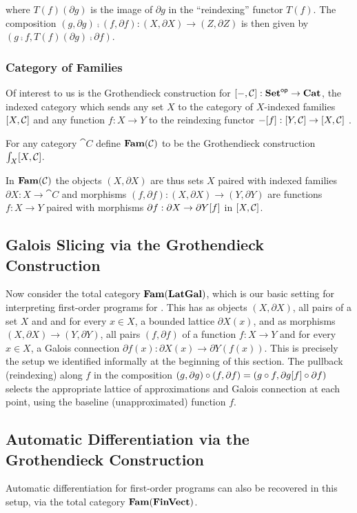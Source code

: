 \noindent where $T(f)(\partial g)$ is the image of $\partial g$ in the ``reindexing'' functor $T(f)$. The
composition $(g, \partial g) \comp (f, \partial f): (X, \partial X) \to (Z, \partial Z)$ is then given by $(g
\comp f, T(f)(\partial g) \comp \partial f)$.

\subsubsection{Category of Families}
\label{sec:Fam}

Of interest to us is the Grothendieck construction for $[-,\mathcal{C}]: \mathbf{Set}^{\mathsf{op}} \to \mathbf{Cat}$, the indexed
category which sends any set $X$ to the category of $X$-indexed families $[X,\mathcal{C}]$ and any function
$f: X \to Y$ to the reindexing functor $-[f]: [Y,\mathcal{C}] \to [X,\mathcal{C}]$ .

\begin{definition}
\label{def:Fam}
For any category $\cat{C}$ define $\mathbf{Fam}(\mathcal{C})$ to be the Grothendieck construction
$\int_{X}[X,\mathcal{C}]$.
\end{definition}

\noindent In $\mathbf{Fam}(\mathcal{C})$ the objects $(X, \partial X)$ are thus sets $X$ paired with indexed families
$\partial X: X \to \cat{C}$ and morphisms $(f, \partial f): (X, \partial X) \to (Y, \partial Y)$ are functions
$f: X \to Y$ paired with morphisms $\partial f: \partial X \to \partial Y[f]$ in
$[X,\mathcal{C}]$.

\subsection{Galois Slicing via the Grothendieck Construction}

Now consider the total category $\mathbf{Fam}(\mathbf{LatGal})$, which is our basic setting for interpreting first-order
programs for \GPS. This has as objects $(X, \partial X)$, all pairs of a set $X$ and and for every $x \in X$,
a bounded lattice $\partial X(x)$, and as morphisms $(X, \partial X) \to (Y, \partial Y)$, all pairs $(f,
\partial f)$ of a function $f: X \to Y$ and for every $x \in X$, a Galois connection $\partial f(x): \partial
X(x) \to \partial Y(f(x))$. This is precisely the setup we identified informally at the beginning of this
section. The pullback (reindexing) along $f$ in the composition $(g, \partial g) \circ (f, \partial f) = (g
\circ f, \partial g[f] \circ \partial f)$ selects the appropriate lattice of approximations and
Galois connection at each point, using the baseline (unapproximated) function $f$.

\subsection{Automatic Differentiation via the Grothendieck Construction}

Automatic differentiation for first-order programs can also be recovered in this setup, via the total category
$\mathbf{Fam}(\mathbf{FinVect})$.
